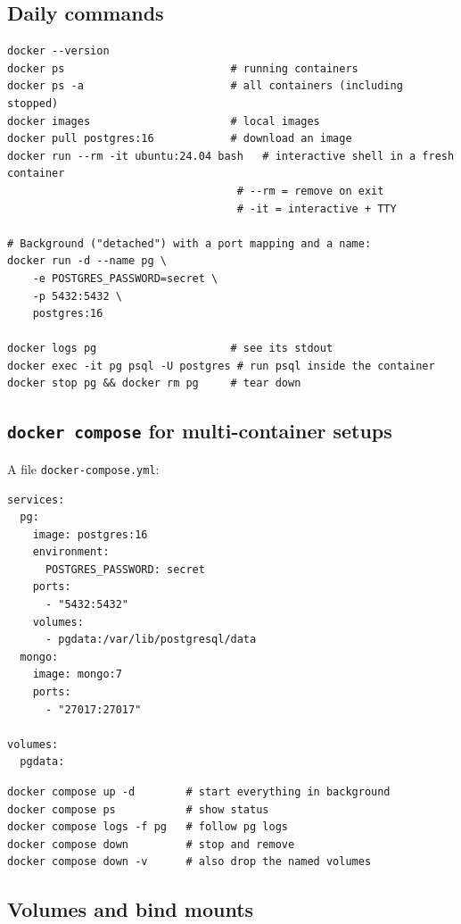 \documentclass[11pt,a4paper]{article}
\begin{document}
\subsection*{Daily commands}

\begin{lstlisting}[style=bashstyle]
docker --version
docker ps                          # running containers
docker ps -a                       # all containers (including stopped)
docker images                      # local images
docker pull postgres:16            # download an image
docker run --rm -it ubuntu:24.04 bash   # interactive shell in a fresh container
                                    # --rm = remove on exit
                                    # -it = interactive + TTY

# Background ("detached") with a port mapping and a name:
docker run -d --name pg \
    -e POSTGRES_PASSWORD=secret \
    -p 5432:5432 \
    postgres:16

docker logs pg                     # see its stdout
docker exec -it pg psql -U postgres # run psql inside the container
docker stop pg && docker rm pg     # tear down
\end{lstlisting}

\subsection*{\texttt{docker compose} for multi-container setups}

A file \texttt{docker-compose.yml}:

\begin{lstlisting}[style=bashstyle]
services:
  pg:
    image: postgres:16
    environment:
      POSTGRES_PASSWORD: secret
    ports:
      - "5432:5432"
    volumes:
      - pgdata:/var/lib/postgresql/data
  mongo:
    image: mongo:7
    ports:
      - "27017:27017"

volumes:
  pgdata:
\end{lstlisting}

\begin{lstlisting}[style=bashstyle]
docker compose up -d        # start everything in background
docker compose ps           # show status
docker compose logs -f pg   # follow pg logs
docker compose down         # stop and remove
docker compose down -v      # also drop the named volumes
\end{lstlisting}

\subsection*{Volumes and bind mounts}
\end{document}
